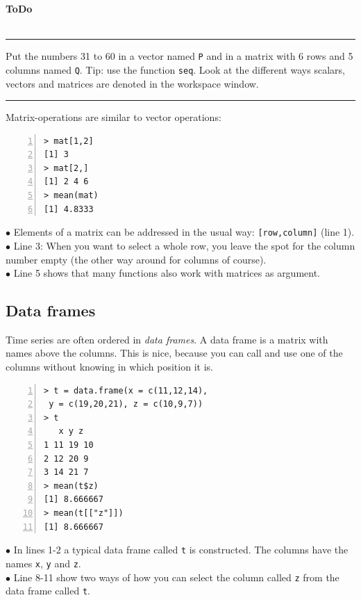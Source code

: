 \documentclass[a4paper,11pt,twocolumn,tablecaptionabove]{scrartcl}
\newenvironment{ToDo} {%
  \begin{flushright}
    \hfill
    \begin{minipage}{0.95\columnwidth}         %
    \textsf{\textbf{ToDo}} \\
      \vspace{-0.85cm}\\
      {\color{Gray}\rule[-0.1cm]{\columnwidth}{1.5pt}}} { %
      {\color{Gray} \rule[0.3cm]{\columnwidth}{1.5pt}}
    \end{minipage}
    \vspace{1em}
  \end{flushright}
  }
\begin{document}
\begin{ToDo}
Put the numbers 31 to 60 in a vector named \texttt{P} and in a matrix with 6 rows and 5 columns named \texttt{Q}. Tip: use the function \texttt{seq}. Look at the different ways scalars, vectors and matrices are denoted in the workspace window.\\
\end{ToDo}
 
 Matrix-operations are similar to vector operations:

\begin{Verbatim}[frame=single,numbers=left,gobble=0, xleftmargin=0.35cm, numbersep=0.1cm]
> mat[1,2]
[1] 3
> mat[2,]
[1] 2 4 6
> mean(mat)
[1] 4.8333
\end{Verbatim}

\noindent $\bullet$ Elements of a matrix can be addressed in the usual way: \texttt{[row,column]} (line 1). \\
\noindent $\bullet$ Line 3: When you want to select a whole row, you leave the spot for the column number empty (the other way around for columns of course).\\
\noindent $\bullet$ Line 5 shows that many functions also work with matrices as argument.\\

\subsection{Data frames}

Time series are often ordered in \emph{data frames}. A data frame is a matrix with names above the columns. This is nice, because you can call and use one of the columns without knowing in which position it is.
\begin{Verbatim}[frame=single,numbers=left,gobble=0, xleftmargin=0.35cm, numbersep=0.1cm]
> t = data.frame(x = c(11,12,14),
 y = c(19,20,21), z = c(10,9,7))
> t
   x y z
1 11 19 10
2 12 20 9 
3 14 21 7  
> mean(t$z)
[1] 8.666667
> mean(t[["z"]])
[1] 8.666667
\end{Verbatim}

\noindent $\bullet$ In lines 1-2 a typical data frame called \texttt{t} is constructed. The columns have the names \texttt{x}, \texttt{y} and \texttt{z}.\\
\noindent $\bullet$ Line 8-11 show two ways of how you can select the column called \texttt{z} from the data frame called \texttt{t}.\\
\\
\end{document}
